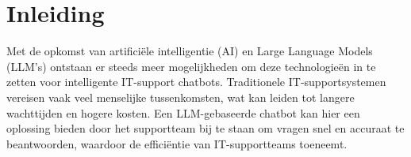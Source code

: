
\chapter{Inleiding}
\label{ch:inleiding}

Met de opkomst van artificiële intelligentie (AI) en Large Language Models (LLM’s) ontstaan er steeds meer mogelijkheden om deze technologieën in te zetten voor intelligente IT-support chatbots. Traditionele IT-supportsystemen vereisen vaak veel menselijke tussenkomsten, wat kan leiden tot langere wachttijden en hogere kosten. Een LLM-gebaseerde chatbot kan hier een oplossing bieden door het supportteam bij te staan om vragen snel en accuraat te beantwoorden, waardoor de efficiëntie van IT-supportteams toeneemt.

\section{}%
\label{sec:probleemstelling}

